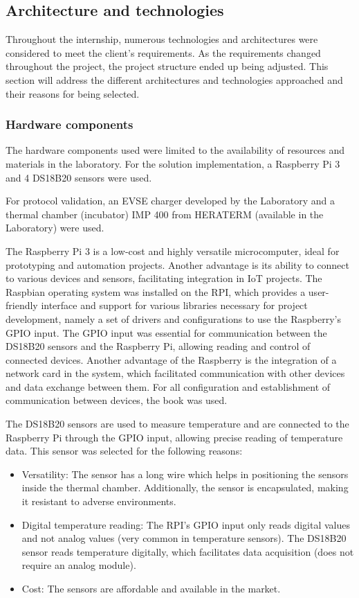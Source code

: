 \subsection{Architecture and technologies}

Throughout the internship, numerous technologies and architectures were considered to meet the client's requirements. As the requirements changed throughout the project, the project structure ended up being adjusted. This section will address the different architectures and technologies approached and their reasons for being selected.

\subsubsection{Hardware components}
The hardware components used were limited to the availability of resources and materials in the laboratory. For the solution implementation, a Raspberry Pi 3 and 4 DS18B20 sensors were used.

For protocol validation, an EVSE charger developed by the Laboratory and a thermal chamber (incubator) IMP 400 from HERATERM (available in the Laboratory) were used.

The Raspberry Pi 3 is a low-cost and highly versatile microcomputer, ideal for prototyping and automation projects. Another advantage is its ability to connect to various devices and sensors, facilitating integration in IoT projects. The Raspbian operating system was installed on the RPI, which provides a user-friendly interface and support for various libraries necessary for project development, namely a set of drivers and configurations to use the Raspberry's GPIO input. The GPIO input was essential for communication between the DS18B20 sensors and the Raspberry Pi, allowing reading and control of connected devices. Another advantage of the Raspberry is the integration of a network card in the system, which facilitated communication with other devices and data exchange between them. For all configuration and establishment of communication between devices, the book \cite{Molloy_2016} was used.

The DS18B20 sensors are used to measure temperature and are connected to the Raspberry Pi through the GPIO input, allowing precise reading of temperature data. This sensor was selected for the following reasons:
\begin{itemize}
    \item Versatility: The sensor has a long wire which helps in positioning the sensors inside the thermal chamber. Additionally, the sensor is encapsulated, making it resistant to adverse environments.
    \item Digital temperature reading: The RPI's GPIO input only reads digital values and not analog values (very common in temperature sensors). The DS18B20 sensor reads temperature digitally, which facilitates data acquisition (does not require an analog module).
    \item Cost: The sensors are affordable and available in the market.
\end{itemize}

